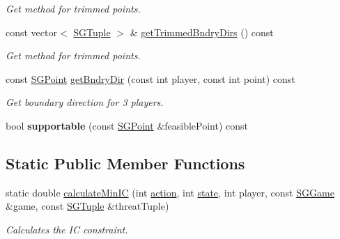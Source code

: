 \begin{DoxyCompactItemize}
\begin{DoxyCompactList}\small\item\em Get method for trimmed points. \end{DoxyCompactList}\item 
\mbox{\label{classSGAction__MaxMinMax_a92231e303ea20977d0aa7339c60d9c08}} 
const vector$<$ \hyperlink{classSGTuple}{S\+G\+Tuple} $>$ \& \hyperlink{classSGAction__MaxMinMax_a92231e303ea20977d0aa7339c60d9c08}{get\+Trimmed\+Bndry\+Dirs} () const
\begin{DoxyCompactList}\small\item\em Get method for trimmed points. \end{DoxyCompactList}\item 
const \hyperlink{classSGPoint}{S\+G\+Point} \hyperlink{classSGAction__MaxMinMax_a2d4762138486ac532de10879eaa2008f}{get\+Bndry\+Dir} (const int player, const int point) const
\begin{DoxyCompactList}\small\item\em Get boundary direction for 3 players. \end{DoxyCompactList}\item 
\mbox{\label{classSGAction__MaxMinMax_a93a9b06f1189763352928ec3c700168f}} 
bool {\bfseries supportable} (const \hyperlink{classSGPoint}{S\+G\+Point} \&feasible\+Point) const
\end{DoxyCompactItemize}
\subsection*{Static Public Member Functions}
\begin{DoxyCompactItemize}
\item 
static double \hyperlink{classSGAction__MaxMinMax_ab91331990288c649ba911c0eda28df3f}{calculate\+Min\+IC} (int \hyperlink{classSGBaseAction_af293adc10da2dbb5a388a2fbcca0c67c}{action}, int \hyperlink{classSGBaseAction_a2301bf142f93f7d3ddedd44676d10c6a}{state}, int player, const \hyperlink{classSGGame}{S\+G\+Game} \&game, const \hyperlink{classSGTuple}{S\+G\+Tuple} \&threat\+Tuple)
\begin{DoxyCompactList}\small\item\em Calculates the IC constraint. \end{DoxyCompactList}\end{DoxyCompactItemize}
